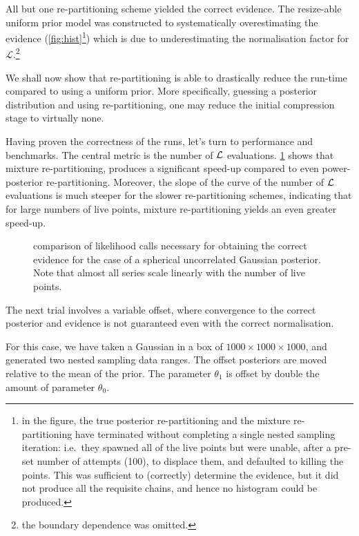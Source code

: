 \documentclass[usenatbib]{mnras}
\begin{document}
All but one re-partitioning scheme yielded the correct evidence. The
resize-able uniform prior model was constructed to systematically
overestimating the evidence (\cref{fig:hist}\footnote{in the figure,
the true posterior re-partitioning and the mixture re-partitioning
have terminated without completing a single nested sampling
iteration: i.e.~they spawned all of the live points but were unable,
after a pre-set number of attempts (100), to displace them, and
defaulted to killing the points. This was sufficient to (correctly)
determine the evidence, but it did not produce all the requisite
chains, and hence no histogram could be produced.}) which is due to
underestimating the normalisation factor for
\(\mathcal{L}\).\footnote{the boundary dependence was omitted.}


We shall now show that re-partitioning is able to drastically reduce
the run-time compared to using a uniform prior. More specifically,
guessing a posterior distribution and using re-partitioning, one may
reduce the initial compression stage to virtually none.

Having proven the correctness of the runs, let's turn to performance
and benchmarks. The central metric is the number of \({\cal L}\)
evaluations. \cref{fig:benchmark} shows that mixture
re-partitioning, produces a significant speed-up compared to even
power-posterior re-partitioning. Moreover, the slope of the curve of
the number of \({\cal L}\) evaluations is much steeper for the
slower re-partitioning schemes, indicating that for large numbers of
live points, mixture re-partitioning yields an even greater
speed-up.



\begin{figure}
  
\caption{comparison of likelihood calls necessary for obtaining the correct evidence for the case of a spherical uncorrelated Gaussian posterior. Note that almost all series scale linearly with the number of live points. \label{fig:benchmark}}
\end{figure}




The next trial involves a variable offset, where convergence to the
correct posterior and evidence is not guaranteed even with the
correct normalisation.

For this case, we have taken a Gaussian in a box of
\(1000\times1000\times1000\), and generated two nested sampling data
ranges. The offset posteriors are moved relative to the mean of the
prior. The parameter $\theta_{1}$ is offset by double the amount of
parameter $\theta_{0}$.
\end{document}
